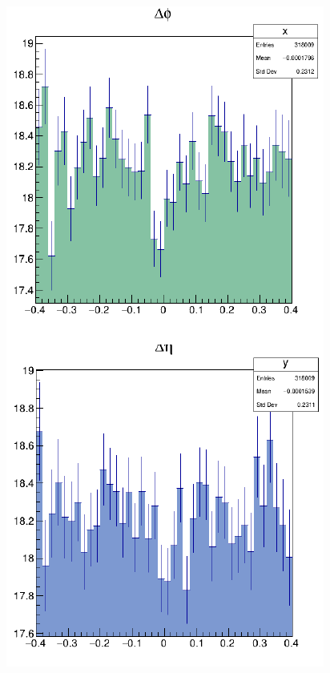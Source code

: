 \documentclass[dvipsnames] {beamer}
\begin{document}
\begin{frame}
\begin{columns}[t]
           \begin{block}{}
              \begin{figure}[H]
            \includegraphics[width=1.\linewidth]{deltaEtaDeltaPhi.png}
          \end{figure}
          \end{block}        
        \end{columns}       
      \end{frame}
        
\end{document}
